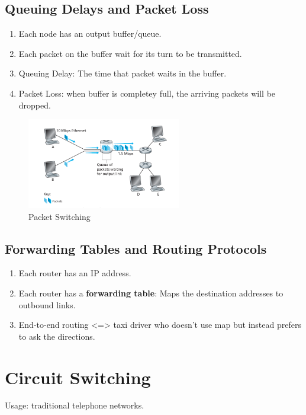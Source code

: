 \subsection{Queuing Delays and Packet Loss}

\begin{enumerate}
    \item Each node has an output buffer/queue.
    \item Each packet on the buffer wait for its turn to be transmitted.
    \item Queuing Delay: The time that packet waits in the buffer.
    \item Packet Loss: when buffer is completey full, the arriving packets will be dropped.
\end{enumerate}

\begin{figure}
    \centering
    \includegraphics[width=0.6\textwidth]{chapters/chapter1/PacketSwitching.png}
    \caption{Packet Switching}
    \label{c1_packetSwitching}
\end{figure}

\subsection{Forwarding Tables and Routing Protocols}

\begin{enumerate}
    \item Each router has an IP address.
    \item Each router has a \textbf{forwarding table}: Maps the destination addresses to outbound links.
    \item End-to-end routing <=> taxi driver who doesn't use map but instead prefers to ask the directions.
\end{enumerate}


\section{Circuit Switching}
Usage: traditional telephone networks.

